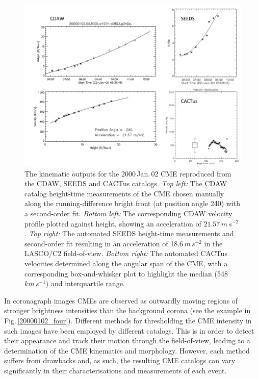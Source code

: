 \documentclass[referee,a4paper,12pt,traditabstract]{swsc}
\begin{document}
\begin{linenumbers}
\begin{figure}[!h]
\centerline{\includegraphics[scale=0.68, trim=20 0 0 0, clip=true]{images/20000102_kins_plots.pdf}}
\caption{The kinematic outputs for the 2000\,Jan.\,02 CME reproduced from the CDAW, SEEDS and CACTus catalogs. \emph{Top left:} The CDAW catalog height-time measurements of the CME chosen manually along the running-difference bright front (at position angle 240) with a second-order fit. \emph{Bottom left:} The corresponding CDAW velocity profile plotted against height, showing an acceleration of $21.57\,m\,s^{-2}$. \emph{Top right:} The automated SEEDS height-time measurements and second-order fit resulting in an acceleration of 18.6\,$m\,s^{-2}$ in the LASCO/C2 field-of-view. \emph{Bottom right:} The automated CACTus velocities determined along the angular span of the CME, with a corresponding box-and-whisker plot to highlight the median (548\,$km\,s^{-1}$) and interquartile range.}
\label{20000102_kins_plots}
\end{figure}

In coronagraph images CMEs are observed as outwardly moving regions of stronger brightness intensities than the background corona (see the example in Fig.\,\ref{20000102_four}). Different methods for thresholding the CME intensity in such images have been employed by different catalogs. This is in order to detect their appearance and track their motion through the field-of-view, leading to a determination of the CME kinematics and morphology. However, each method suffers from drawbacks and, as such, the resulting CME catalogs can vary significantly in their characterisations and measurements of each event. 



\end{linenumbers}
\end{document}
